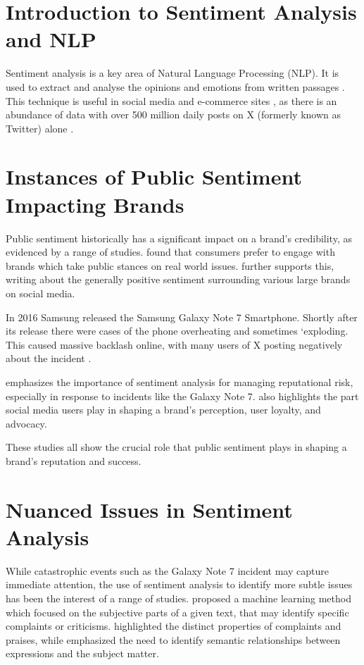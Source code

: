 \section{Introduction to Sentiment Analysis and NLP}
Sentiment analysis is a key area of Natural Language Processing (NLP). It is used to extract and analyse the opinions and emotions from written passages \citep{dhuria2015sentiment, mishra2022data}. This technique is useful in social media and e-commerce sites \citep{anny2022sentiment}, as there is an abundance of data with over 500 million daily posts on X (formerly known as Twitter) alone \citep{sayce2022twitter}.

\section{Instances of Public Sentiment Impacting Brands}
Public sentiment historically has a significant impact on a brand's credibility, as evidenced by a range of studies. \citet{berestova2022consumers} found that consumers prefer to engage with brands which take public stances on real world issues. \citet{mostafa2013more} further supports this, writing about the generally positive sentiment surrounding various large brands on social media.

In 2016 Samsung released the Samsung Galaxy Note 7 Smartphone. Shortly after its release there were cases of the phone overheating and sometimes `exploding. This caused massive backlash online, with many users of X posting negatively about the incident \citep{kang2019social}.

\citet{lange2011people} emphasizes the importance of sentiment analysis for managing reputational risk, especially in response to incidents like the Galaxy Note 7. \citet{hu2017analyzing} also highlights the part social media users play in shaping a brand's perception, user loyalty, and advocacy.

These studies all show the crucial role that public sentiment plays in shaping a brand's reputation and success.

\section{Nuanced Issues in Sentiment Analysis}
While catastrophic events such as the Galaxy Note 7 incident may capture immediate attention, the use of sentiment analysis to identify more subtle issues has been the interest of a range of studies. \citet{pang2004sentimental} proposed a machine learning method which focused on the subjective parts of a given text, that may identify specific complaints or criticisms. \citet{zhou2016linguistic} highlighted the distinct properties of complaints and praises, while \citet{nasukawa2003sentiment} emphasized the need to identify semantic relationships between expressions and the subject matter.

